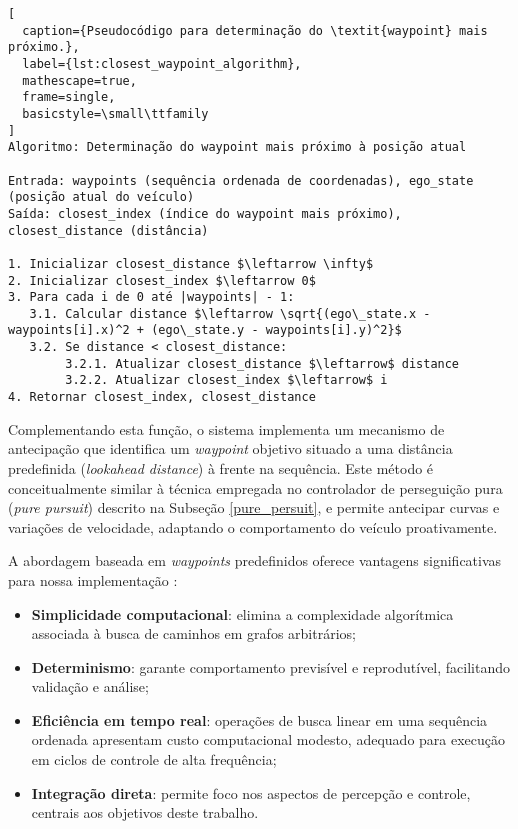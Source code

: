 \begin{lstlisting}[
  caption={Pseudocódigo para determinação do \textit{waypoint} mais próximo.},
  label={lst:closest_waypoint_algorithm},
  mathescape=true,
  frame=single,
  basicstyle=\small\ttfamily
]
Algoritmo: Determinação do waypoint mais próximo à posição atual

Entrada: waypoints (sequência ordenada de coordenadas), ego_state (posição atual do veículo)
Saída: closest_index (índice do waypoint mais próximo), closest_distance (distância)

1. Inicializar closest_distance $\leftarrow \infty$
2. Inicializar closest_index $\leftarrow 0$
3. Para cada i de 0 até |waypoints| - 1:
   3.1. Calcular distance $\leftarrow \sqrt{(ego\_state.x - waypoints[i].x)^2 + (ego\_state.y - waypoints[i].y)^2}$
   3.2. Se distance < closest_distance:
        3.2.1. Atualizar closest_distance $\leftarrow$ distance
        3.2.2. Atualizar closest_index $\leftarrow$ i
4. Retornar closest_index, closest_distance
\end{lstlisting}

Complementando esta função, o sistema implementa um mecanismo de antecipação que identifica um \textit{waypoint} objetivo situado a uma distância predefinida (\textit{lookahead distance}) à frente na sequência. Este método é conceitualmente similar à técnica empregada no controlador de perseguição pura (\textit{pure pursuit}) descrito na Subseção \ref{pure_persuit}, e permite antecipar curvas e variações de velocidade, adaptando o comportamento do veículo proativamente.

A abordagem baseada em \textit{waypoints} predefinidos oferece vantagens significativas para nossa implementação \cite{University_of_Toronto2018-mp}:

\begin{itemize}
    \item \textbf{Simplicidade computacional}: elimina a complexidade algorítmica associada à busca de caminhos em grafos arbitrários;
    \item \textbf{Determinismo}: garante comportamento previsível e reprodutível, facilitando validação e análise;
    \item \textbf{Eficiência em tempo real}: operações de busca linear em uma sequência ordenada apresentam custo computacional modesto, adequado para execução em ciclos de controle de alta frequência;
    \item \textbf{Integração direta}: permite foco nos aspectos de percepção e controle, centrais aos objetivos deste trabalho.
\end{itemize}


